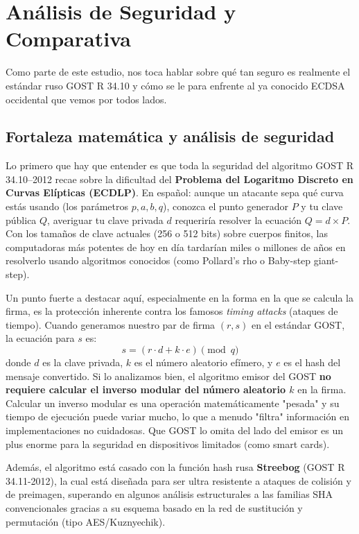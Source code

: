 \section{Análisis de Seguridad y Comparativa}

Como parte de este estudio, nos toca hablar sobre qué tan seguro es realmente el estándar ruso GOST R 34.10 y cómo se le para enfrente al ya conocido ECDSA occidental que vemos por todos lados.

\subsection{Fortaleza matemática y análisis de seguridad}

Lo primero que hay que entender es que toda la seguridad del algoritmo GOST R 34.10--2012 recae sobre la dificultad del \textbf{Problema del Logaritmo Discreto en Curvas Elípticas (ECDLP)}. En español: aunque un atacante sepa qué curva estás usando (los parámetros $p, a, b, q$), conozca el punto generador $P$ y tu clave pública $Q$, averiguar tu clave privada $d$ requeriría resolver la ecuación $Q = d \times P$. Con los tamaños de clave actuales (256 o 512 bits) sobre cuerpos finitos, las computadoras más potentes de hoy en día tardarían miles o millones de años en resolverlo usando algoritmos conocidos (como Pollard’s rho o Baby-step giant-step).

Un punto fuerte a destacar aquí, especialmente en la forma en la que se calcula la firma, es la protección inherente contra los famosos \textit{timing attacks} (ataques de tiempo). Cuando generamos nuestro par de firma $(r, s)$ en el estándar GOST, la ecuación para $s$ es:
$$ s = (r \cdot d + k \cdot e) \pmod q $$
donde $d$ es la clave privada, $k$ es el número aleatorio efímero, y $e$ es el hash del mensaje convertido. 
Si lo analizamos bien, el algoritmo emisor del GOST \textbf{no requiere calcular el inverso modular del número aleatorio $k$} en la firma. Calcular un inverso modular es una operación matemáticamente "pesada" y su tiempo de ejecución puede variar mucho, lo que a menudo "filtra" información en implementaciones no cuidadosas. Que GOST lo omita del lado del emisor es un plus enorme para la seguridad en dispositivos limitados (como smart cards).

Además, el algoritmo está casado con la función hash rusa \textbf{Streebog} (GOST R 34.11-2012), la cual está diseñada para ser ultra resistente a ataques de colisión y de preimagen, superando en algunos análisis estructurales a las familias SHA convencionales gracias a su esquema basado en la red de sustitución y permutación (tipo AES/Kuznyechik).

